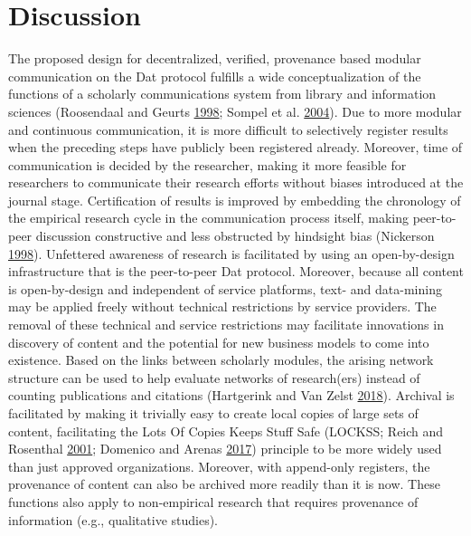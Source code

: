 \documentclass[a5paper]{book}
\begin{document}
\section{Discussion}\label{discussion-8}

The proposed design for decentralized, verified, provenance based
modular communication on the Dat protocol fulfills a wide
conceptualization of the functions of a scholarly communications system
from library and information sciences (Roosendaal and Geurts
\protect\hyperlink{ref-roosendaal1998}{1998}; Sompel et al.
\protect\hyperlink{ref-doi:10.1045ux2fseptember2004-vandesompel}{2004}).
Due to more modular and continuous communication, it is more difficult
to selectively register results when the preceding steps have publicly
been registered already. Moreover, time of communication is decided by
the researcher, making it more feasible for researchers to communicate
their research efforts without biases introduced at the journal stage.
Certification of results is improved by embedding the chronology of the
empirical research cycle in the communication process itself, making
peer-to-peer discussion constructive and less obstructed by hindsight
bias (Nickerson
\protect\hyperlink{ref-doi:10.1037ux2f1089-2680.2.2.175}{1998}).
Unfettered awareness of research is facilitated by using an
open-by-design infrastructure that is the peer-to-peer Dat protocol.
Moreover, because all content is open-by-design and independent of
service platforms, text- and data-mining may be applied freely without
technical restrictions by service providers. The removal of these
technical and service restrictions may facilitate innovations in
discovery of content and the potential for new business models to come
into existence. Based on the links between scholarly modules, the
arising network structure can be used to help evaluate networks of
research(ers) instead of counting publications and citations (Hartgerink
and Van Zelst
\protect\hyperlink{ref-doi:10.3390ux2fpublications6020021}{2018}).
Archival is facilitated by making it trivially easy to create local
copies of large sets of content, facilitating the Lots Of Copies Keeps
Stuff Safe (LOCKSS; Reich and Rosenthal
\protect\hyperlink{ref-doi:10.1045ux2fjune2001-reich}{2001}; Domenico
and Arenas
\protect\hyperlink{ref-doi:10.1103ux2fphysreve.95.022313}{2017})
principle to be more widely used than just approved organizations.
Moreover, with append-only registers, the provenance of content can also
be archived more readily than it is now. These functions also apply to
non-empirical research that requires provenance of information (e.g.,
qualitative studies).
\end{document}
